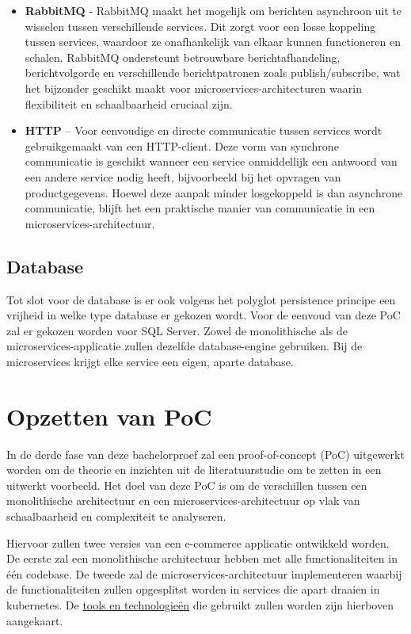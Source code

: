 \begin{itemize}
	\item \textbf{RabbitMQ} - RabbitMQ maakt het mogelijk om berichten asynchroon uit te wisselen tussen verschillende services. Dit zorgt voor een losse koppeling tussen services, waardoor ze onafhankelijk van elkaar kunnen functioneren en schalen. RabbitMQ ondersteunt betrouwbare berichtafhandeling, berichtvolgorde en verschillende berichtpatronen zoals publish/subscribe, wat het bijzonder geschikt maakt voor microservices-architecturen waarin flexibiliteit en schaalbaarheid cruciaal zijn.
	\item \textbf{HTTP} – Voor eenvoudige en directe communicatie tussen services wordt gebruikgemaakt van een HTTP-client. Deze vorm van synchrone communicatie is geschikt wanneer een service onmiddellijk een antwoord van een andere service nodig heeft, bijvoorbeeld bij het opvragen van productgegevens. Hoewel deze aanpak minder losgekoppeld is dan asynchrone communicatie, blijft het een praktische manier van communicatie in een microservices-architectuur.
\end{itemize}

\subsection{Database}

Tot slot voor de database is er ook volgens het polyglot persistence principe een vrijheid in welke type database er gekozen wordt. Voor de eenvoud van deze PoC zal er gekozen worden voor SQL Server. Zowel de monolithische als de microservices-applicatie zullen dezelfde database-engine gebruiken. Bij de microservices krijgt elke service een eigen, aparte database.

\section{Opzetten van PoC}
\label{opzetten_poc}

In de derde fase van deze bachelorproef zal een proof-of-concept (PoC) uitgewerkt worden om de theorie en inzichten uit de literatuurstudie om te zetten in een uitwerkt voorbeeld. Het doel van deze PoC is om de verschillen tussen een monolithische architectuur en een microservices-architectuur op vlak van schaalbaarheid en complexiteit te analyseren.

Hiervoor zullen twee versies van een e-commerce applicatie ontwikkeld worden. De eerste zal een monolithische architectuur hebben met alle functionaliteiten in één codebase. De tweede zal de microservices-architectuur implementeren waarbij de functionaliteiten zullen opgesplitst worden in services die apart draaien in kubernetes. De \hyperref[tools_en_technologieën]{tools en technologieën} die gebruikt zullen worden zijn hierboven aangekaart.


